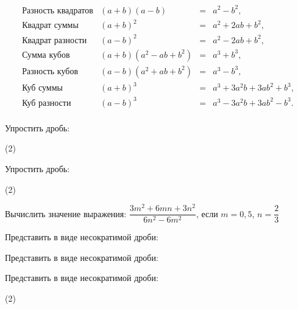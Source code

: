 \begin{class}[number=2]
\[ \begin{array}{cccc}
	\text{Разность квадратов}&(a+b)(a-b)& =&a^2-b^2,\\
	\text{Квадрат суммы}&(a+b)^2& =&a^2+2ab+b^2,\\
	\text{Квадрат разности}&(a-b)^2& =&a^2-2ab+b^2,\\
	\text{Сумма кубов}&(a+b)(a^2-ab+b^2)& =&a^3+b^3,\\
	\text{Разность кубов}&(a-b)(a^2+ab+b^2)& =&a^3-b^3,\\
	\text{Куб суммы}&(a+b)^3& =&a^3+3a^2b+3ab^2+b^3,\\
	\text{Куб разности}&(a-b)^3& =&a^3-3a^2b+3ab^2-b^3.\\
\end{array} \]
\begin{listofex}
	\item Упростить дробь:
	\begin{tasks}(2)
		\task {}
		\task {}
		\task {}
		\task {}
		\task {}
		\task {}
	\end{tasks}
	\item Упростить дробь:
	\begin{tasks}(2)
		\task {}
		\task {}
		\task {}
		\task {}
		\task {}
		\task {}
		\task {}
		\task {}
	\end{tasks}
	\item Вычислить значение выражения: \( \dfrac{3m^2+6mn+3n^2}{6n^2-6m^2} \), если \( m=0,5 \), \( n=\dfrac{2}{3} \)
	\item Представить в виде несократимой дроби:
	\begin{itasks}[2]
		\task {}
		\task {}
		\task {}
		\task {}
		\task {}
	\end{itasks}
	\item Представить в виде несократимой дроби:
	\begin{itasks}[2]
		\task {}
		\task {}
		\task {}
	\end{itasks}
	\item Представить в виде несократимой дроби:
	\begin{tasks}(2)
		\task {}
		\task {}
		\task {}
		\task {}
		\task {}
		\task {}

\end{tasks}
\end{listofex}
\end{class}
